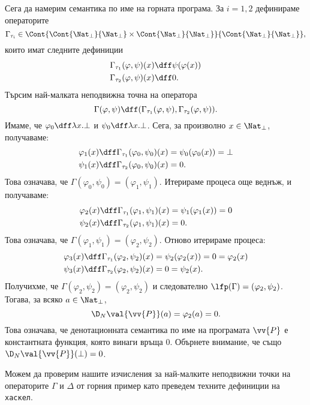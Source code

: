 \begin{example}
  Сега да намерим семантика по име на горната програма.
За $i = 1,2$ дефинираме операторите 
  \[\Gamma_{\tau_i} \in \Cont{\Cont{\Nat_\bot}{\Nat_\bot} \times \Cont{\Nat_\bot}{\Nat_\bot}}{\Cont{\Nat_\bot}{\Nat_\bot}},\]
  които имат следните дефиниции
  \begin{align*}
    \Gamma_{\tau_1}(\varphi,\psi)(x) & \dff \psi(\varphi(x))\\
    \Gamma_{\tau_2}(\varphi,\psi)(x) & \dff 0.
  \end{align*}
  Търсим най-малката неподвижна точна на оператора 
  \[\Gamma(\varphi,\psi) \dff (\Gamma_{\tau_1}(\varphi, \psi), \Gamma_{\tau_2}(\varphi,\psi)).\]
  Имаме, че $\varphi_0 \dff \lambda x.\bot$ и $\psi_0 \dff \lambda x.\bot$.
  Сега, за произволно $x \in \Nat_\bot$, получаваме:
  \begin{align*}
    \varphi_1(x) & \dff \Gamma_{\tau_1}(\varphi_0,\psi_0)(x) = \psi_0(\varphi_0(x)) = \bot\\
    \psi_1(x) & \dff \Gamma_{\tau_2}(\varphi_0,\psi_0)(x) = 0.
  \end{align*}
  Това означава, че $\Gamma(\varphi_0,\psi_0) = (\varphi_1,\psi_1)$.
  Итерираме процеса още веднъж, и получаваме:
  \begin{align*}
    \varphi_2(x) & \dff \Gamma_{\tau_1}(\varphi_1,\psi_1)(x) = \psi_1(\varphi_1(x)) = 0\\
    \psi_2(x) & \dff \Gamma_{\tau_2}(\varphi_1,\psi_1)(x) = 0.
  \end{align*}
  Това означава, че $\Gamma(\varphi_1,\psi_1) = (\varphi_2,\psi_2)$.
  Отново итерираме процеса:
    \begin{align*}
      \varphi_3(x) & \dff \Gamma_{\tau_1}(\varphi_2,\psi_2)(x) = \psi_2(\varphi_2(x)) = 0 = \varphi_2(x)\\
      \psi_3(x) & \dff \Gamma_{\tau_2}(\varphi_2,\psi_2)(x) = 0 = \psi_2(x).
  \end{align*}
  Получихме, че $\Gamma(\varphi_2,\psi_2) = (\varphi_2,\psi_2)$ и
  следователно $\lfp(\Gamma) = (\varphi_2,\psi_2)$. 
  Тогава, за всяко $a \in \Nat_\bot$,
  \[\D_N\val{\vv{P}}(a) = \varphi_2(a) = 0.\]
  Това означава, че денотационната семантика по име на програмата $\vv{P}$ е константната функция, която винаги връща $0$.
  Обърнете внимание, че също $\D_N\val{\vv{P}}(\bot) = 0$.
\end{example}

Можем да проверим нашите изчисления за най-малките неподвижни точки на операторите $\Gamma$ и $\Delta$
от горния пример като преведем техните дефиниции на \texttt{хаскел}.

